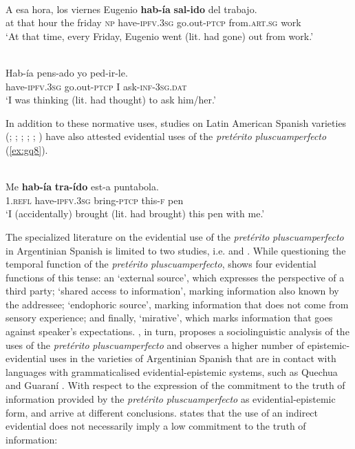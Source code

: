 \documentclass[output=paper]{langsci/langscibook}
\begin{document}
\ea \label{ex:gq6}
\\
\gll A esa hora, los viernes Eugenio \textbf{hab-ía} \textbf{sal-ido} del trabajo.\\
at that hour the friday \textsc{np} have-\textsc{ipfv.3sg} go.out-\textsc{ptcp} from.\textsc{art.sg} work\\
\glt ‘At that time, every Friday, Eugenio went (lit. had gone) out from work.’
\z


\ea  \label{ex:gq7}
	\\
	\gll Hab-ía pens-ado yo ped-ir-le.\\
	have-\textsc{ipfv.3sg} go.out-\textsc{ptcp} I ask-\textsc{inf-3sg.dat}\\
	\glt ‘I was thinking (lit. had thought) to ask him/her.’
\z 


In addition to these normative uses, studies on Latin American Spanish varieties (\citealt{Laprade1981}; \citealt{Mendoza1991};  \citealt{CallisayaApaza2012}; \citealt{Adelaar2004}; \citealt{Speranza2014}; \citealt{Bermudez2008}) have also attested evidential uses of the \textit{pretérito} \textit{pluscuamperfecto} (\ref{ex:gq8}). 


\ea \label{ex:gq8}
	\\
	\gll Me \textbf{hab-ía} \textbf{tra-ído} est-a puntabola.\\
	1.\textsc{refl} have-\textsc{ipfv.3sg} bring-\textsc{ptcp} this-\textsc{f} pen\\
	\glt ‘I (accidentally) brought (lit. had brought) this pen with me.’
\z

The specialized literature on the evidential use of the \textit{pretérito} \textit{pluscuamperfecto} in Argentinian Spanish is limited to two studies, i.e. \citet{Bermudez2008} and \citet{Speranza2014}. While questioning the temporal function of the \textit{pretérito} \textit{pluscuamperfecto}, \citet{Bermudez2008} shows four evidential functions of this tense: an ‘external source’, which expresses the perspective of a third party; ‘shared access to information’, marking information also known by the addressee; ‘endophoric source’, marking information that does not come from sensory experience; and finally, ‘mirative’, which marks information that goes against speaker’s expectations. \citet{Speranza2014}, in turn, proposes a sociolinguistic analysis of the uses of the \textit{pretérito} \textit{pluscuamperfecto} and observes a higher number of epistemic-evidential uses in the varieties of Argentinian Spanish that are in contact with languages with grammaticalised evidential-epistemic systems, such as Quechua and Guaraní \citep[26]{Speranza2014}. With respect to the expression of the commitment to the truth of information provided by the \textit{pretérito} \textit{pluscuamperfecto} as evidential-epistemic form, \citet{Bermudez2008} and \citet{Speranza2014} arrive at different conclusions. \citet[217]{Bermudez2008} states that the use of an indirect evidential does not necessarily imply a low commitment to the truth of information: 
\end{document}
